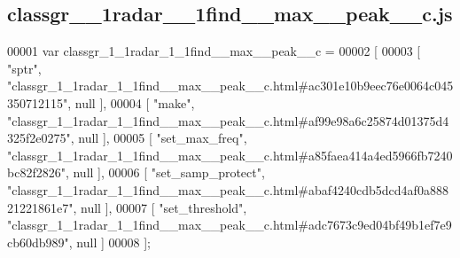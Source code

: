 \subsection{classgr\+\_\+\_\+1radar\+\_\+\_\+1find\+\_\+\+\_\+max\+\_\+\+\_\+peak\+\_\+\+\_\+c.\+js}
\label{classgr__1__1radar__1__1find____max____peak____c_8js_source}

\begin{DoxyCode}
00001 var classgr_1_1radar_1_1find__max__peak__c =
00002 [
00003     [ \textcolor{stringliteral}{"sptr"}, \textcolor{stringliteral}{"classgr\_1\_1radar\_1\_1find\_\_max\_\_peak\_\_c.html#ac301e10b9eec76e0064c045350712115"}, null ],
00004     [ \textcolor{stringliteral}{"make"}, \textcolor{stringliteral}{"classgr\_1\_1radar\_1\_1find\_\_max\_\_peak\_\_c.html#af99e98a6c25874d01375d4325f2e0275"}, null ],
00005     [ \textcolor{stringliteral}{"set\_max\_freq"}, \textcolor{stringliteral}{"classgr\_1\_1radar\_1\_1find\_\_max\_\_peak\_\_c.html#a85faea414a4ed5966fb7240bc82f2826"}, null
       ],
00006     [ \textcolor{stringliteral}{"set\_samp\_protect"}, \textcolor{stringliteral}{"classgr\_1\_1radar\_1\_1find\_\_max\_\_peak\_\_c.html#abaf4240cdb5dcd4af0a88821221861e7"}, 
      null ],
00007     [ \textcolor{stringliteral}{"set\_threshold"}, \textcolor{stringliteral}{"classgr\_1\_1radar\_1\_1find\_\_max\_\_peak\_\_c.html#adc7673c9ed04bf49b1ef7e9cb60db989"}, 
      null ]
00008 ];
\end{DoxyCode}
